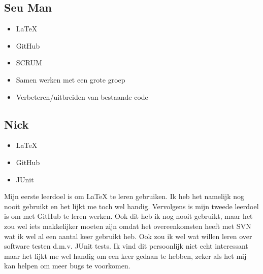 \documentclass{article}
\begin{document}
\subsection*{Seu Man}
\begin{itemize}
	\item \LaTeX
	\item GitHub
	\item SCRUM
	\item Samen werken met een grote groep
	\item Verbeteren/uitbreiden van bestaande code
\end{itemize}

\subsection*{Nick}
\begin{itemize}
	\item \LaTeX
	\item GitHub
	\item JUnit
\end{itemize} 
Mijn eerste leerdoel is om \LaTeX{} te leren gebruiken. Ik heb het namelijk nog nooit gebruikt en het lijkt me toch wel handig. Vervolgens is mijn tweede leerdoel is om met GitHub te leren werken. Ook dit heb ik nog nooit gebruikt,  maar het zou wel iets makkelijker moeten zijn omdat het overeenkomsten heeft met SVN wat ik wel al
een aantal keer gebruikt heb. Ook zou ik wel wat willen leren over software testen d.m.v. JUnit tests. Ik vind dit persoonlijk niet echt interessant maar het lijkt me wel handig om een keer gedaan te hebben, zeker als het mij kan helpen om  meer bugs te voorkomen.
\end{document}
